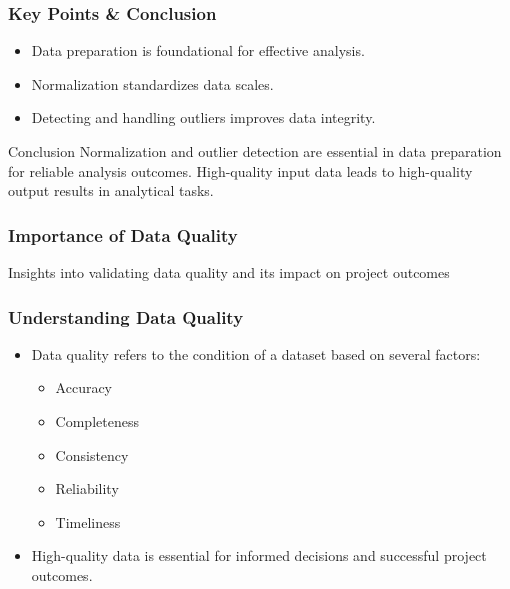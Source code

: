 \documentclass[aspectratio=169]{beamer}
\begin{document}
\begin{frame}[fragile]
    \frametitle{Key Points & Conclusion}
    \begin{itemize}
        \item Data preparation is foundational for effective analysis.
        \item Normalization standardizes data scales.
        \item Detecting and handling outliers improves data integrity.
    \end{itemize}

    \begin{block}{Conclusion}
        Normalization and outlier detection are essential in data preparation for reliable analysis outcomes. High-quality input data leads to high-quality output results in analytical tasks.
    \end{block}
\end{frame}

\begin{frame}
    \frametitle{Importance of Data Quality}
    Insights into validating data quality and its impact on project outcomes
\end{frame}

\begin{frame}
    \frametitle{Understanding Data Quality}
    \begin{itemize}
        \item Data quality refers to the condition of a dataset based on several factors:
        \begin{itemize}
            \item Accuracy
            \item Completeness
            \item Consistency
            \item Reliability
            \item Timeliness
        \end{itemize}
        \item High-quality data is essential for informed decisions and successful project outcomes.
    \end{itemize}
\end{frame}
\end{document}
